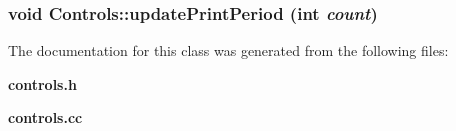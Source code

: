 \subsubsection{\setlength{\rightskip}{0pt plus 5cm}void Controls::update\-Print\-Period (int {\em count})}\label{classControls_e1db7c3b628effa61e25f9b186755ddd}




The documentation for this class was generated from the following files:\begin{CompactItemize}
\item 
{\bf controls.h}\item 
{\bf controls.cc}\end{CompactItemize}
